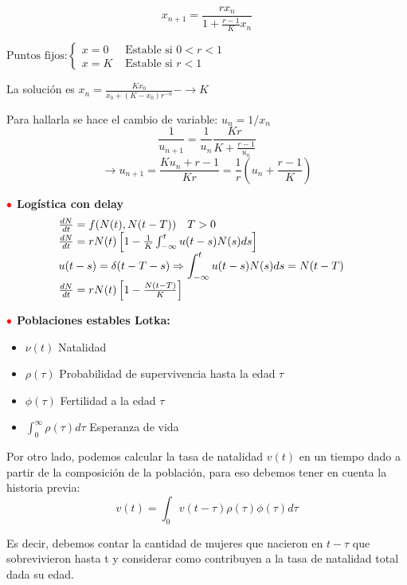 \documentclass[%
 reprint,
 amsmath,amssymb,
 aps,
]{revtex4-1}
\newcommand{\tema}{\color{red}{\bullet}}
\begin{document}
$$
x_{n+1}=\frac{r x_{n}}{1+\frac{r-1}{K} x_{n}}
$$

$
\text{Puntos fijos:}
\left\{
\begin{array}{ll}
  x=0 & \text { Estable si } 0<r<1 \\ 
  x=K & \text { Estable si } r<1
\end{array}
\right.$ 


La solución es $x_{n}=\frac{K x_{0}}{x_{0}+\left(K-x_{0}\right) r^{-n}}-\rightarrow K$

Para hallarla se hace el cambio de variable:
$
u_{n}=1 / x_{n}
$
$$
\frac{1}{u_{n+1}}=\frac{1}{u_{n}} \frac{K r}{K+\frac{r-1}{u_{n}}} 
$$
$$
\longrightarrow u_{n+1}=\frac{K u_{n}+r-1}{K r}=\frac{1}{r}\left(u_{n}+\frac{r-1}{K}\right)
$$

$\tema$ \textbf{Logística con delay }
$$
\begin{aligned}\centering
&\begin{array}{l}
\frac{d N}{d t}=f(N(t), N(t-T)) \quad T>0 \\
\frac{d N}{d t}=r N(t)\left[1-\frac{1}{K} \int_{-\infty}^{t} u(t-s) N(s) d s\right] \\
\begin{aligned}
u(t-s)=\delta(t-T-s) \Rightarrow \int_{-\infty}^{t} u(t-s) N(s) d s=N(t-T)
\end{aligned} \\
\frac{d N}{d t}=r N(t)\left[1-\frac{N(t-T)}{K}\right]
\end{array}
\end{aligned}
$$

$\tema$ \textbf{Poblaciones estables Lotka:}
\begin{itemize}
  \item[] $\nu(t)$ Natalidad
  \item[] $\rho(\tau)$ Probabilidad de supervivencia hasta la edad $\tau$
  \item[] $\phi(\tau)$ Fertilidad a la edad $\tau$
  \item[] $\int_{0}^{\infty} \rho(\tau) d \tau$ Esperanza de vida
\end{itemize}


Por otro lado, podemos calcular la tasa de natalidad $v(t)$ en un tiempo dado a partir de la composición de la población, para eso debemos tener en cuenta la historia previa:
$$
v(t)=\int_{0} v(t-\tau) \rho(\tau) \phi(\tau) d \tau
$$

Es decir, debemos contar la cantidad de mujeres que nacieron en $t-\tau$ que sobrevivieron hasta t y considerar como contribuyen a la tasa de natalidad total dada su edad.
\end{document}
